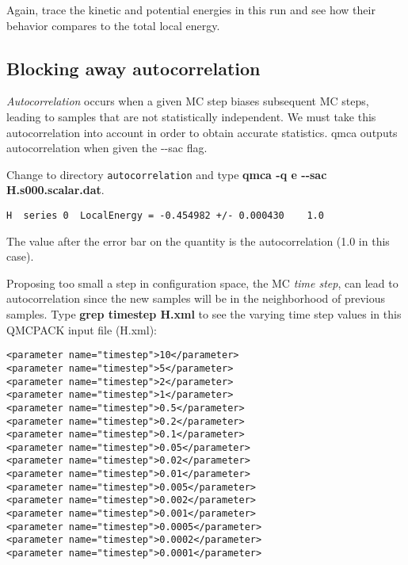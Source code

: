 Again, trace the kinetic and potential energies in this run and see how their
behavior compares to the total local energy.

\subsection{Blocking away autocorrelation}

\textit{Autocorrelation} occurs when a given MC step biases subsequent MC
steps, leading to samples that are not statistically independent.  We must take
this autocorrelation into account in order to obtain accurate statistics.  qmca
outputs autocorrelation when given the {-}{-}sac flag.

Change to directory \texttt{autocorrelation} and type \textbf{qmca -q e
{-}{-}sac H.s000.scalar.dat}.  

\begin{shaded} 
\begin{verbatim} 
H  series 0  LocalEnergy = -0.454982 +/- 0.000430    1.0 
\end{verbatim} 
\end{shaded}

The value after the error bar on the quantity is the autocorrelation (1.0 in
this case).

Proposing too small a step in configuration space, the MC \textit{time step},
can lead to autocorrelation since the new samples will be in the neighborhood
of previous samples.  Type \textbf{grep timestep H.xml} to see the varying time
step values in this QMCPACK input file (H.xml):

\begin{shaded} 
\begin{verbatim} 
<parameter name="timestep">10</parameter>
<parameter name="timestep">5</parameter> 
<parameter name="timestep">2</parameter> 
<parameter name="timestep">1</parameter>
<parameter name="timestep">0.5</parameter> 
<parameter name="timestep">0.2</parameter> 
<parameter name="timestep">0.1</parameter>
<parameter name="timestep">0.05</parameter> 
<parameter name="timestep">0.02</parameter> 
<parameter name="timestep">0.01</parameter>
<parameter name="timestep">0.005</parameter> 
<parameter name="timestep">0.002</parameter> 
<parameter name="timestep">0.001</parameter>
<parameter name="timestep">0.0005</parameter> 
<parameter name="timestep">0.0002</parameter> 
<parameter name="timestep">0.0001</parameter> 
\end{verbatim} 
\end{shaded}

